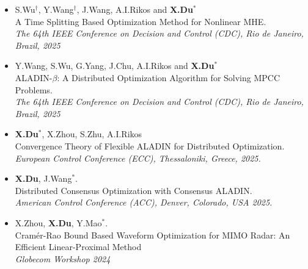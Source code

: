 \documentclass[paper=a4,fontsize=11pt]{scrartcl} %
\begin{document}
\begin{itemize}
	\item [\textbf{C11}] {S.Wu$^\dagger$, Y.Wang$^\dagger$, J.Wang, A.I.Rikos and \textbf{X.Du}$^*$ \\
	{A Time Splitting Based Optimization Method for Nonlinear MHE.}\\
	\emph{The 64th IEEE Conference on Decision and Control (CDC), Rio de Janeiro, Brazil, 2025
} }

	\item [\textbf{C10}] {Y.Wang, S.Wu, G.Yang, J.Chu, A.I.Rikos and \textbf{X.Du}$^*$ \\
	{ALADIN-$\beta$: A Distributed Optimization Algorithm for Solving MPCC Problems.}\\
	\emph{The 64th IEEE Conference on Decision and Control (CDC), Rio de Janeiro, Brazil, 2025
} }

		
	\item [\textbf{C9}] {\textbf{X.Du}$^*$, X.Zhou, S.Zhu, A.I.Rikos \\
		{ Convergence Theory of Flexible ALADIN for Distributed Optimization.}\\
		\emph{European Control Conference (ECC), Thessaloniki, Greece, 2025.
	} }
	
		\item [\textbf{C8}] {\textbf{X.Du}, J.Wang$^*$. \\
		{ Distributed Consensus Optimization with Consensus ALADIN.}\\
		\emph{American Control Conference (ACC), Denver, Colorado, USA 2025.
	} }
		\item [\textbf{C7}] {X.Zhou, \textbf{X.Du},   Y.Mao$^*$. \\
		{Cram\'er-Rao Bound Based Waveform Optimization for MIMO Radar: An Efficient Linear-Proximal Method}\\
		\emph{Globecom Workshop 2024
	} }
	

\end{itemize}
\end{document}
